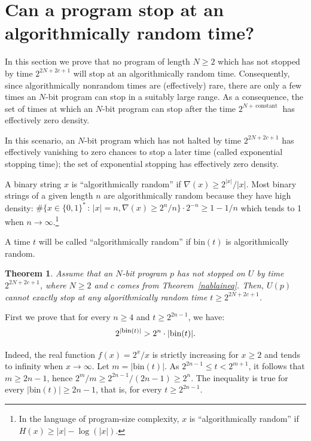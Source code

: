 \documentclass[12pt,twoside,openright]{report}
\newtheorem{thm}{Theorem}
\newcommand{\bin}{\mbox{bin}}
\newcommand{\fbin}{\mbox{\rm \footnotesize{bin}}}
\newcommand{\myproof}{\noindent {\em Proof.}  }
\begin{document}
\section{Can a program stop at an algorithmically random time?}

In this section we prove that no program of length $N\ge 2$ which has not stopped by time $2^{2N+2c+1}$ will stop at an algorithmically random time.  Consequently, since  algorithmically nonrandom times are (effectively) rare, there are only a few times an $N$-bit program can stop in a suitably large range.  As a consequence, the set of times at which an $N$-bit program can stop after the time $2^{N +\,\mbox{constant }}$ has effectively zero density.

In this scenario, an $N$-bit program which has not halted by time
$2^{2N+2c+1}$ has effectively vanishing to zero chances to stop a later time
(called exponential stopping time); the set of exponential stopping has effectively zero density.
\fi

\medskip 

A binary string $x$ is ``algorithmically random'' if $\nabla (x) \ge  2^{|x|}/|x|$. Most binary strings of a given length $n$ are  algorithmically random because they have high density:  $\#\{ x \in \{0, 1\}^{*} \,:\, |x|=n, \nabla (x) \ge 2^{n}/n\}\cdot 2^{-n} \ge 1 - 1/n$ which tends to 1 when $n \rightarrow \infty$.\footnote{In the language of program-size complexity, $x$ is ``algorithmically random'' if $H(x) \ge |x| - \log (|x|)$.}

A time $t$ will be called ``algorithmically random'' if $\bin (t)$ is algorithmically random. 

\begin{thm}
\label{randstop}
Assume that an $N$-bit program $p$ has not stopped on $U$  by time $2^{2N+2c+1}$, where $N\ge 2$ and $c$ comes from Theorem~\ref{nablaineq}.  Then, $U(p)$ cannot exactly stop at any algorithmically random time $t \ge 2^{2N+2c+1}$.
\end{thm}

\myproof First we prove that for every $n\ge 4$  and $t\ge 2^{2n-1}$, we have: 
\begin{equation}
\label{ubound}
2^{|\fbin(t)|} > 2^{n} \cdot |\bin(t)|.
\end{equation}


Indeed, the real function $f(x) = 2^{x}/x$ is strictly increasing for $x \ge 2$ and tends to infinity when $x \rightarrow \infty$.  Let $m=|\bin(t)|$.  As $2^{2n-1} \le t < 2^{m+1}$, it follows that $m \ge 2n-1$, hence  $2^{m}/m \ge 2^{2n-1}/(2n-1) \ge 2^{n}$.  The inequality  is true for every $|\bin (t)| \ge  2n-1$, that is, for every $t\ge 2^{2n-1}$.
\end{document}
